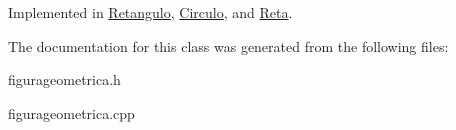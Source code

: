 Implemented in \mbox{\hyperlink{class_retangulo_ac088dd6d3f4f3d3f80363a868c2e74f1}{Retangulo}}, \mbox{\hyperlink{class_circulo_a593787d6e0618c2eded23e8839e7bea6}{Circulo}}, and \mbox{\hyperlink{class_reta_ac2e9805183cd474b62bffd8b032cd780}{Reta}}.



The documentation for this class was generated from the following files\+:\begin{DoxyCompactItemize}
\item 
figurageometrica.\+h\item 
figurageometrica.\+cpp\end{DoxyCompactItemize}
